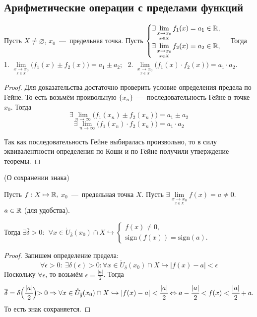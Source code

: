 \subsection{Арифметические операции с пределами функций}

\begin{theorem}
    Пусть $X \neq \varnothing$, $x_{0}$~---~предельная точка. Пусть $\begin{cases}
        \exists \lim\limits_{\underset{x \in X}{x\to x_0}} f_{1} (x) = a_{1} \in \mathbb{R}, \\
        \exists \lim\limits_{\underset{x \in X}{x\to x_0}} f_{2} (x) = a_{2} \in \mathbb{R}, \\
    \end{cases}$ Тогда
        1. $\lim\limits_{\underset{x \in X}{x\to x_0}} \big(f_{1} (x) \pm  f_{2} (x)\big) = a_{1} \pm a_{2}$; \  
        2. $\lim\limits_{\underset{x \in X}{x\to x_0}} \big(f_{1} (x) \cdot f_{2} (x) \big) = a_{1} \cdot a_{2}$.
\end{theorem}
\begin{proof}
    Для доказательства достаточно проверить условие определения предела по Гейне. То есть возьмём проивольную $\{x_{n}\}$~---~последовательность Гейне в точке $x_{0}$. Тогда
    $$
    \exists \lim\limits_{n\to \infty} \big(f_{1}(x_{n}) \pm f_{2}(x_{n})\big) = a_{1} \pm a_{2}
    $$
    $$
    \exists \lim\limits_{n\to \infty} \big(f_{1}(x_{n}) \cdot f_{2}(x_{n})\big) = a_{1} \cdot a_{2}
    $$

    Так как последовательность Гейне выбиралась произвольно, то в силу эквивалентности определения по Коши и по Гейне получили утверждение теоремы.
\end{proof}

\begin{lemma}
    \hypertarget{lemm4.4}{(О сохранении знака)} Пусть $f: X \mapsto \mathbb{R},$ $x_{0}$~---~предельная точка $X$. Пусть $\exists \lim\limits_{\underset{x \in X}{x\to x_0}} f(x) = a \neq 0$. $a \in \mathbb{R}$ (для удобства).

    Тогда $ \exists \overline{\delta} > 0: \ \ \forall x\in  \mathring{U}_{\overline{\delta}}(x_{0}) \cap X \hookrightarrow 
    \begin{cases}
        f(x) \neq 0, \\
        \text{sign}( f(x)) = \text{sign} (a).
        \end{cases}$
\end{lemma}
\begin{proof}
    Запишем определение предела:
    $$\forall\epsilon > 0: \ \exists\delta(\epsilon) > 0: \forall x \in \mathring{U}_{\overline{\delta}}(x_{0}) \cap X \hookrightarrow |f(x) - a| < \epsilon
    $$
    Поскольку $\forall \epsilon$, то возьмём $\epsilon = \frac{|a|}{2}$. Тогда
    $$
    \overline{\delta} = \delta\Bigr(\cfrac{|a|}{2}\Bigl) > 0 \Rightarrow \forall x \in \mathring{U}_{\overline{\delta}}(x_{0}) \cap X \hookrightarrow |f(x) - a| < \cfrac{|a|}{2} \Leftrightarrow a - \cfrac{|a|}{2} < f(x) < \cfrac{|a|}{2} + a.
    $$
    То есть знак сохраняется.
\end{proof}

